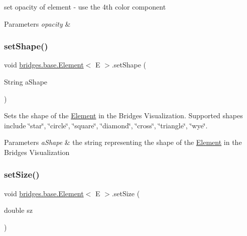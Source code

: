 set opacity of element -\/ use the 4th color component


\begin{DoxyParams}{Parameters}
{\em opacity} & \\
\hline
\end{DoxyParams}
\mbox{\label{classbridges_1_1base_1_1_element_ae65bfb47628e028c21c43553ef59b7a2}} 
\subsubsection{\texorpdfstring{set\+Shape()}{setShape()}}
{\footnotesize\ttfamily void \hyperlink{classbridges_1_1base_1_1_element}{bridges.\+base.\+Element}$<$ E $>$.set\+Shape (\begin{DoxyParamCaption}\item[{String}]{a\+Shape }\end{DoxyParamCaption})}

Sets the shape of the \hyperlink{classbridges_1_1base_1_1_element}{Element} in the Bridges Visualization. Supported shapes include \char`\"{}star\char`\"{}, \char`\"{}circle\char`\"{}, \char`\"{}square\char`\"{}, \char`\"{}diamond\char`\"{}, \char`\"{}cross\char`\"{}, \char`\"{}triangle\char`\"{}, \char`\"{}wye\char`\"{}.


\begin{DoxyParams}{Parameters}
{\em a\+Shape} & the string representing the shape of the \hyperlink{classbridges_1_1base_1_1_element}{Element} in the Bridges Visualization \\
\hline
\end{DoxyParams}
\mbox{\label{classbridges_1_1base_1_1_element_a57153c203d8d2790650edb14ad61c338}} 
\subsubsection{\texorpdfstring{set\+Size()}{setSize()}}
{\footnotesize\ttfamily void \hyperlink{classbridges_1_1base_1_1_element}{bridges.\+base.\+Element}$<$ E $>$.set\+Size (\begin{DoxyParamCaption}\item[{double}]{sz }\end{DoxyParamCaption})}

